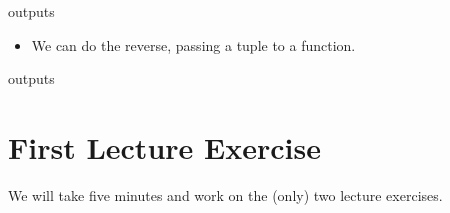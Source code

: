 \documentclass[letterpaper,10pt,english]{sphinxmanual}
\begin{document}
outputs
\begin{quote}

%
\begin{sphinxVerbatim}[commandchars=\\\{\}]
        
\end{sphinxVerbatim}
\end{quote}
\begin{itemize}
\item {} 
We can do the reverse, passing a tuple to a function.

%
\begin{sphinxVerbatim}[commandchars=\\\{\}]
   
     \PYG{p}{[}\PYG{p}{]}  \PYG{p}{[}\PYG{p}{]}  \PYG{p}{[}\PYG{p}{]}

    
 
\end{sphinxVerbatim}

\end{itemize}

outputs
\begin{quote}

%
\begin{sphinxVerbatim}[commandchars=\\\{\}]
\end{sphinxVerbatim}
\end{quote}


\section{First Lecture Exercise}
\label{\detokenize{lecture_notes/lec07_modules_images:first-lecture-exercise}}
We will take five minutes and work on the (only) two lecture exercises.
\end{document}
